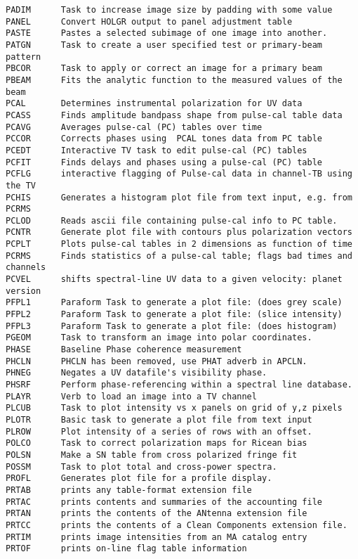 \begin{verbatim}
PADIM      Task to increase image size by padding with some value
PANEL      Convert HOLGR output to panel adjustment table
PASTE      Pastes a selected subimage of one image into another.
PATGN      Task to create a user specified test or primary-beam pattern
PBCOR      Task to apply or correct an image for a primary beam
PBEAM      Fits the analytic function to the measured values of the beam
PCAL       Determines instrumental polarization for UV data
PCASS      Finds amplitude bandpass shape from pulse-cal table data
PCAVG      Averages pulse-cal (PC) tables over time
PCCOR      Corrects phases using  PCAL tones data from PC table
PCEDT      Interactive TV task to edit pulse-cal (PC) tables
PCFIT      Finds delays and phases using a pulse-cal (PC) table
PCFLG      interactive flagging of Pulse-cal data in channel-TB using the TV
PCHIS      Generates a histogram plot file from text input, e.g. from PCRMS
PCLOD      Reads ascii file containing pulse-cal info to PC table.
PCNTR      Generate plot file with contours plus polarization vectors
PCPLT      Plots pulse-cal tables in 2 dimensions as function of time
PCRMS      Finds statistics of a pulse-cal table; flags bad times and channels
PCVEL      shifts spectral-line UV data to a given velocity: planet version
PFPL1      Paraform Task to generate a plot file: (does grey scale)
PFPL2      Paraform Task to generate a plot file: (slice intensity)
PFPL3      Paraform Task to generate a plot file: (does histogram)
PGEOM      Task to transform an image into polar coordinates.
PHASE      Baseline Phase coherence measurement
PHCLN      PHCLN has been removed, use PHAT adverb in APCLN.
PHNEG      Negates a UV datafile's visibility phase.
PHSRF      Perform phase-referencing within a spectral line database.
PLAYR      Verb to load an image into a TV channel
PLCUB      Task to plot intensity vs x panels on grid of y,z pixels
PLOTR      Basic task to generate a plot file from text input
PLROW      Plot intensity of a series of rows with an offset.
POLCO      Task to correct polarization maps for Ricean bias
POLSN      Make a SN table from cross polarized fringe fit
POSSM      Task to plot total and cross-power spectra.
PROFL      Generates plot file for a profile display.
PRTAB      prints any table-format extension file
PRTAC      prints contents and summaries of the accounting file
PRTAN      prints the contents of the ANtenna extension file
PRTCC      prints the contents of a Clean Components extension file.
PRTIM      prints image intensities from an MA catalog entry
PRTOF      prints on-line flag table information

\end{verbatim}
